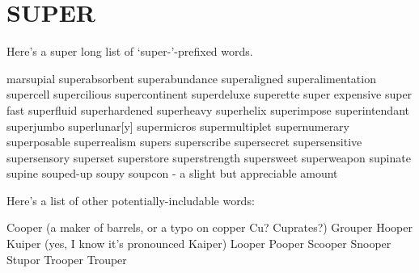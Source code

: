 \section{SUPER}
Here's a super long list of `super-'-prefixed words.

marsupial
superabsorbent
superabundance
superaligned
superalimentation
supercell
supercilious
supercontinent
superdeluxe
superette
super expensive
super fast
superfluid
superhardened
superheavy
superhelix
superimpose
superintendant
superjumbo
superlunar[y]
supermicros
supermultiplet
supernumerary
superposable
superrealism
supers
superscribe
supersecret
supersensitive
supersensory
superset
superstore
superstrength
supersweet
superweapon
supinate
supine
souped-up
soupy
soupcon - a slight but appreciable amount

Here's a list of other potentially-includable words:

Cooper (a maker of barrels, or a typo on copper Cu?  Cuprates?)
Grouper
Hooper
Kuiper (yes, I know it's pronounced Kaiper)
Looper
Pooper
Scooper
Snooper
Stupor
Trooper
Trouper